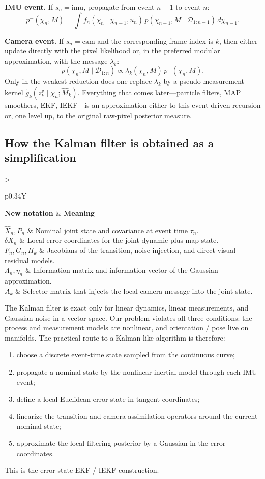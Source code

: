 \documentclass[11pt]{report}
\newcommand{\NotationTable}[1]{%
\vspace{0.6mm}
{\scriptsize
\setlength{\tabcolsep}{2.5pt}
\begin{tabularx}{\columnwidth}{>{\raggedright\arraybackslash}p{0.34\columnwidth}Y}
\toprule
\textbf{New notation} & \textbf{Meaning}\\
\midrule
#1\\
\bottomrule
\end{tabularx}}
\vspace{0.8mm}}
\begin{document}
\textbf{IMU event.} If $s_n=\mathrm{imu}$, propagate from event $n-1$ to event $n$:
\begin{equation}
p^-(\chi_n,M)=\int f_n(\chi_n\mid \chi_{n-1},u_n)\,p(\chi_{n-1},M\mid \mathcal D_{1:n-1})\,d\chi_{n-1}.
\label{eq:discrete_posterior_recursion_sweep}
\end{equation}

\textbf{Camera event.} If $s_n=\mathrm{cam}$ and the corresponding frame index is $k$, then either update directly with the pixel likelihood or, in the preferred modular approximation, with the message $\lambda_k$:
\begin{equation}
p(\chi_n,M\mid \mathcal D_{1:n})
\propto
\lambda_k(\chi_n,M)\,p^-(\chi_n,M).
\label{eq:exact_filtering_recursion_sweep}
\end{equation}
Only in the weakest reduction does one replace $\lambda_k$ by a pseudo-measurement kernel $\tilde g_k(z_k^v\mid \chi_n;\widehat M_k)$. Everything that comes later---particle filters, MAP smoothers, EKF, IEKF---is an approximation either to this event-driven recursion or, one level up, to the original raw-pixel posterior measure.

\subsection{How the Kalman filter is obtained as a simplification}
\NotationTable{
$\hat X_n,P_n$ & Nominal joint state and covariance at event time $\tau_n$.\\
$\delta X_n$ & Local error coordinates for the joint dynamic-plus-map state.\\
$F_n,G_n,H_k$ & Jacobians of the transition, noise injection, and direct visual residual models.\\
$\Lambda_n,\eta_n$ & Information matrix and information vector of the Gaussian approximation.\\
$A_k$ & Selector matrix that injects the local camera message into the joint state.}

The Kalman filter is exact only for linear dynamics, linear measurements, and Gaussian noise in a vector space. Our problem violates all three conditions: the process and measurement models are nonlinear, and orientation / pose live on manifolds. The practical route to a Kalman-like algorithm is therefore:
\begin{enumerate}
  \item choose a discrete event-time state sampled from the continuous curve;
  \item propagate a nominal state by the nonlinear inertial model through each IMU event;
  \item define a local Euclidean error state in tangent coordinates;
  \item linearize the transition and camera-assimilation operators around the current nominal state;
  \item approximate the local filtering posterior by a Gaussian in the error coordinates.
\end{enumerate}
This is the error-state EKF / IEKF construction.
\end{document}
